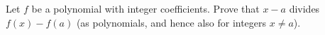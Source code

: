 Let $f$ be a polynomial with integer coefficients. Prove that $x-a$ divides $f(x)-f(a)$ (as polynomials, and hence also for integers $x\ne a$).
